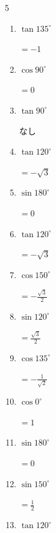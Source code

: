 \begin{multicols}{5}
\begin{enumerate}
  \itemsep=7pt
  \item $\displaystyle \tan{135^\circ}$

        $\displaystyle =-1$

  \item $\displaystyle \cos{90^\circ}$

        $\displaystyle =0$

  \item $\displaystyle \tan{90^\circ}$

        $\displaystyle なし$

  \item $\displaystyle \tan{120^\circ}$

        $\displaystyle =-\sqrt{3}$

  \item $\displaystyle \sin{180^\circ}$

        $\displaystyle =0$

  \item $\displaystyle \tan{120^\circ}$

        $\displaystyle =-\sqrt{3}$

  \item $\displaystyle \cos{150^\circ}$

        $\displaystyle =-\frac{\sqrt{3}}{2}$

  \item $\displaystyle \sin{120^\circ}$

        $\displaystyle =\frac{\sqrt{3}}{2}$

  \item $\displaystyle \cos{135^\circ}$

        $\displaystyle =-\frac{1}{\sqrt{2}}$

  \item $\displaystyle \cos{0^\circ}$

        $\displaystyle =1$

  \item $\displaystyle \sin{180^\circ}$

        $\displaystyle =0$

  \item $\displaystyle \sin{150^\circ}$

        $\displaystyle =\frac{1}{2}$

  \item $\displaystyle \tan{120^\circ}$


\end{enumerate}
\end{multicols}
